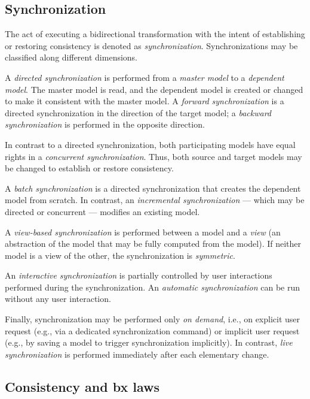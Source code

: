 \subsection{Synchronization}
\label{sec:Synchronization}

The act of executing a bidirectional transformation with the intent of establishing or restoring consistency is denoted as \emph{synchronization}. 
Synchronizations may be classified along different dimensions.

A \emph{directed synchronization} is performed from a \emph{master model} to a \emph{dependent model}. The master model is read, and the dependent model is created or changed to make it consistent with the master model. A \emph{forward synchronization} is a directed synchronization in the direction of the target model; a \emph{backward synchronization} is performed in the opposite direction.

In contrast to a directed synchronization, both participating models have equal rights in a \emph{concurrent synchronization}. Thus, both source and target models may be changed to establish or restore consistency.

A \emph{batch synchronization} is a directed synchronization that creates the dependent model from scratch. In contrast, an \emph{incremental synchronization} --- which may be directed or concurrent --- modifies an existing model.

A \emph{view-based synchronization} is performed between a model and a \emph{view} (an abstraction of the model that may be fully computed from the model). If neither model is a view of the other, the synchronization is \emph{symmetric}. 

An \emph{interactive synchronization} is partially controlled by user interactions performed during the synchronization. An \emph{automatic synchronization} can be run without any user interaction.

Finally, synchronization may be performed only \emph{on demand}, i.e., on explicit user request (e.g., via a dedicated synchronization command) or implicit user request (e.g., by saving a model to trigger synchronization implicitly).
In contrast, \emph{live synchronization} is performed immediately after each elementary change.  

\subsection{Consistency and bx laws}
\label{sec:Consistency}

